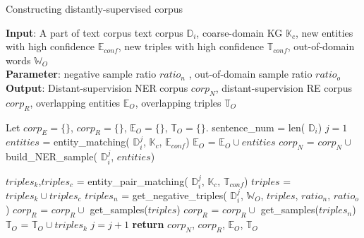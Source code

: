 \documentclass[sigconf]{acmart}
\begin{document}
\begin{algorithm}[tb]
	\caption{Constructing distantly-supervised corpus}
	\label{alg:algorithm2}
	\textbf{Input}: A part of text corpus text corpus $\mathbb{D}_i$, coarse-domain KG $\mathbb{K}_c$, new entities with high confidence $\mathbb{E}_{conf}$, new triples  with high confidence $\mathbb{T}_{conf}$, out-of-domain words $\mathbb{W}_O$ \\
	\textbf{Parameter}:  negative sample ratio ${ratio_n}$ ,  out-of-domain sample ratio ${ratio_o}$ \\
	\textbf{Output}: Distant-supervision NER corpus $corp_N$, distant-supervision RE corpus $corp_R$, overlapping entities $\mathbb{E}_O$, overlapping triples $\mathbb{T}_O$  
	\begin{algorithmic}[1] %
		\STATE Let  $corp_E=\{\}$,  $corp_R=\{\}$, $\mathbb{E}_O=\{\}$, $\mathbb{T}_O=\{\}$.
		\STATE sentence\_num = len( $\mathbb{D}_i$)
		\STATE $j = 1$
		\STATE $entities$ = entity\_matching( $\mathbb{D}_i^{j}$, $\mathbb{K}_c$, $\mathbb{E}_{conf}$)
		\STATE $\mathbb{E}_O$ = $\mathbb{E}_O \cup entities$
		\STATE  $corp_N$ =  $corp_N \cup$ build\_NER\_sample( $\mathbb{D}_i^{j}$, $entities$)
		
		\STATE $triples_k$,$triples_c$ = entity\_pair\_matching( $\mathbb{D}_i^{j}$, $\mathbb{K}_c$, $\mathbb{T}_{conf}$)
		\STATE  $triples$ = $triples_k \cup triples_c$
		\STATE $triples_n$ = get\_negative\_triples( $\mathbb{D}_i^{j}$, $\mathbb{W}_O$, $triples$, ${ratio_n}$, ${ratio_o}$)
		\STATE  $corp_R$ = $corp_R  \cup $ get\_samples($triples$)
		\STATE  $corp_R$ = $corp_R  \cup $ get\_samples($triples_n$)
		\STATE $\mathbb{T}_O$ = $\mathbb{T}_O \cup triples_k $  
		\STATE $j = j + 1$
		\ENDWHILE
		\STATE \textbf{return} $corp_N$, $corp_R$, $\mathbb{E}_O$, $\mathbb{T}_O$ 
	\end{algorithmic}
\end{algorithm}
\end{document}
